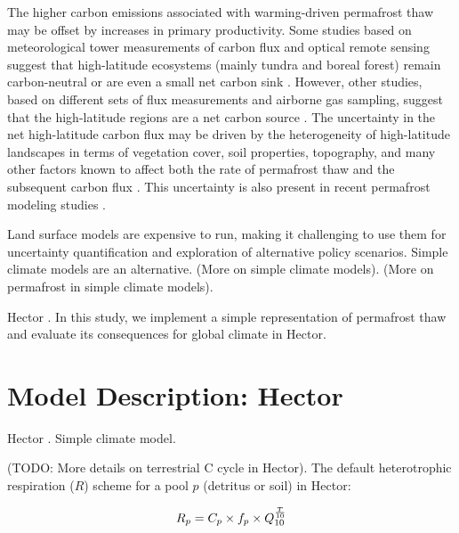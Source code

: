 \documentclass[essd, manuscript]{copernicus}
\begin{document}
The higher carbon emissions associated with warming-driven permafrost thaw may be offset by increases in primary productivity.
Some studies based on meteorological tower measurements of carbon flux and optical remote sensing suggest that high-latitude ecosystems (mainly tundra and boreal forest) remain carbon-neutral or are even a small net carbon sink \citep{mcguire_2012_assessment; welp_2016_increasing}.
However, other studies, based on different sets of flux measurements and airborne gas sampling, suggest that the high-latitude regions are a net carbon source \citep{belshe_2013_tundra; commane_2017_carbon; natali_2019_large}.
The uncertainty in the net high-latitude carbon flux may be driven by the heterogeneity of high-latitude landscapes in terms of vegetation cover, soil properties, topography, and many other factors known to affect both the rate of permafrost thaw and the subsequent carbon flux \citep{turetsky_2002_boreal; wickland_2006_effects; lund_2010_variability; james_2013_multidecadal; johnson_2013_permafrost; grant_2019_modeling1; grant_2019_modeling2}.
This uncertainty is also present in recent permafrost modeling studies \citep{burke_2017_quantifying; qian_2010_enhanced; ito_2016_impacts; harp_2016_effect}.

Land surface models are expensive to run, making it challenging to use them for uncertainty quantification and exploration of alternative policy scenarios.
Simple climate models are an alternative.
(More on simple climate models).
(More on permafrost in simple climate models).

Hector \citep{hartin_2015_simple; vega-westhoff_2019_impacts}.
In this study, we implement a simple representation of permafrost thaw and evaluate its consequences for global climate in Hector.


\section{Model Description: Hector}
Hector \citep{hartin_2015_simple; hartin_2016_ocean}.
Simple climate model.

(TODO: More details on terrestrial C cycle in Hector).
The default heterotrophic respiration ($R$) scheme for a pool $p$ (detritus or soil) in Hector:

\begin{equation*}
R_{p} = C_p \times f_p \times Q_{10} ^ \frac{T}{10} \\    
\end{equation*} 
\end{document}
